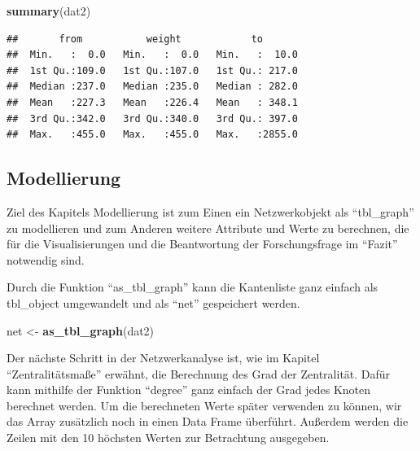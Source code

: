 \documentclass[]{article}
\newenvironment{Shaded}{\begin{snugshade}}{\end{snugshade}}
\newcommand{\DecValTok}[1]{\textcolor[rgb]{0.00,0.00,0.81}{#1}}
\newcommand{\KeywordTok}[1]{\textcolor[rgb]{0.13,0.29,0.53}{\textbf{#1}}}
\newcommand{\NormalTok}[1]{#1}
\newcommand{\OperatorTok}[1]{\textcolor[rgb]{0.81,0.36,0.00}{\textbf{#1}}}
\newcommand{\StringTok}[1]{\textcolor[rgb]{0.31,0.60,0.02}{#1}}
\begin{document}
\begin{Shaded}
\begin{Highlighting}[]
\KeywordTok{summary}\NormalTok{(dat2)}
\end{Highlighting}
\end{Shaded}

\begin{verbatim}
##       from           weight            to        
##  Min.   :  0.0   Min.   :  0.0   Min.   :  10.0  
##  1st Qu.:109.0   1st Qu.:107.0   1st Qu.: 217.0  
##  Median :237.0   Median :235.0   Median : 282.0  
##  Mean   :227.3   Mean   :226.4   Mean   : 348.1  
##  3rd Qu.:342.0   3rd Qu.:340.0   3rd Qu.: 397.0  
##  Max.   :455.0   Max.   :455.0   Max.   :2855.0
\end{verbatim}

\hypertarget{modellierung}{%
\subsection{Modellierung}\label{modellierung}}

Ziel des Kapitels Modellierung ist zum Einen ein Netzwerkobjekt als
``tbl\_graph'' zu modellieren und zum Anderen weitere Attribute und
Werte zu berechnen, die für die Visualisierungen und die Beantwortung
der Forschungsfrage im ``Fazit'' notwendig sind.

Durch die Funktion ``as\_tbl\_graph'' kann die Kantenliste ganz einfach
als tbl\_object umgewandelt und als ``net'' gespeichert werden.

\begin{Shaded}
\begin{Highlighting}[]
\NormalTok{net <-}\StringTok{ }\KeywordTok{as_tbl_graph}\NormalTok{(dat2)}
\end{Highlighting}
\end{Shaded}

Der nächste Schritt in der Netzwerkanalyse ist, wie im Kapitel
``Zentralitätsmaße'' erwähnt, die Berechnung des Grad der Zentralität.
Dafür kann mithilfe der Funktion ``degree'' ganz einfach der Grad jedes
Knoten berechnet werden. Um die berechneten Werte später verwenden zu
können, wir das Array zusätzlich noch in einen Data Frame überführt.
Außerdem werden die Zeilen mit den 10 höchsten Werten zur Betrachtung
ausgegeben.

\begin{Shaded}
\end{Shaded}
\end{document}
